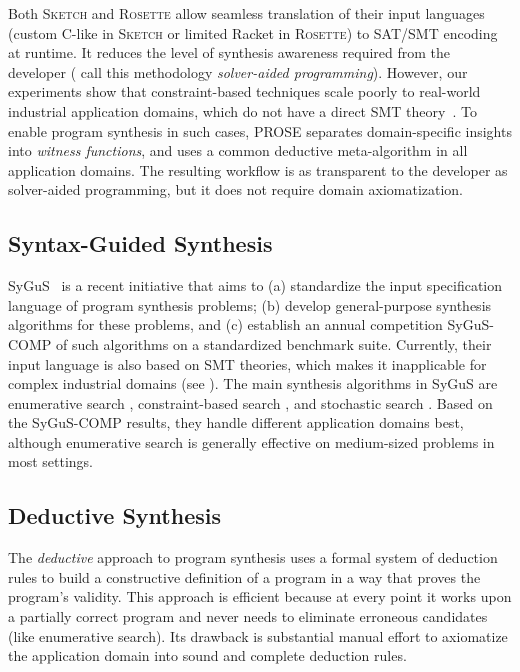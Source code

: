 Both \textsc{Sketch} and \textsc{Rosette} allow seamless translation of their input languages (custom C-like in
\textsc{Sketch} or limited Racket in \textsc{Rosette}) to SAT/SMT encoding at runtime.
It reduces the level of synthesis awareness required from the developer (\citeauthor{rosette} call this methodology
\emph{solver-aided programming}).
However, our experiments show that constraint-based techniques scale poorly to real-world industrial application
domains, which do not have a direct SMT theory~\cite{andersen:procedural,singh2012synthesizing}.
To enable program synthesis in such cases, PROSE separates domain-specific insights into \emph{witness
functions}, and uses a common deductive meta-algorithm in all application domains.
The resulting workflow is as transparent to the developer as solver-aided programming, but it does not require domain
axiomatization.

\subsection{Syntax-Guided Synthesis}
SyGuS~\cite{sygus} is a recent initiative that aims to (a) standardize the input specification language of program
synthesis problems;
(b) develop general-purpose synthesis algorithms for these problems, and
(c) establish an annual competition SyGuS-COMP of such algorithms on a standardized benchmark suite.
Currently, their input language is also based on SMT theories, which makes it inapplicable for complex industrial
domains (see ).
The main synthesis algorithms in SyGuS are enumerative search \cite{transit:protocols}, constraint-based search
\cite{bitvectors}, and stochastic search \cite{schkufza2013stochastic}.
Based on the SyGuS-COMP results, they handle different application domains best, although enumerative search is
generally effective on medium-sized problems in most settings.

\subsection{Deductive Synthesis}
The \emph{deductive} approach to program synthesis \cite{manna1980deductive} uses a formal system of deduction rules to
build a constructive definition of a program in a way that proves the program's validity.
This approach is efficient because at every point it works upon a partially correct program and never needs to eliminate
erroneous candidates (like enumerative search).
Its drawback is substantial manual effort to axiomatize the application domain into sound and complete deduction rules.

